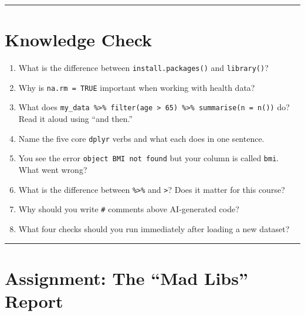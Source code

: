\documentclass[
  letterpaper,
  DIV=11,
  numbers=noendperiod,
  oneside]{scrreprt}
\providecommand{\tightlist}{%
  \setlength{\itemsep}{0pt}\setlength{\parskip}{0pt}}
\begin{document}
\begin{center}\rule{0.5\linewidth}{0.5pt}\end{center}

\section*{\texorpdfstring{Knowledge Check
}{Knowledge Check }}\label{knowledge-check}


\begin{enumerate}
\def\labelenumi{\arabic{enumi}.}
\tightlist
\item
  What is the difference between \texttt{install.packages()} and
  \texttt{library()}?
\item
  Why is \texttt{na.rm\ =\ TRUE} important when working with health
  data?
\item
  What does
  \texttt{my\_data\ \%\textgreater{}\%\ filter(age\ \textgreater{}\ 65)\ \%\textgreater{}\%\ summarise(n\ =\ n())}
  do? Read it aloud using ``and then.''
\item
  Name the five core \texttt{dplyr} verbs and what each does in one
  sentence.
\item
  You see the error
  \texttt{object\ \textquotesingle{}BMI\textquotesingle{}\ not\ found}
  but your column is called \texttt{bmi}. What went wrong?
\item
  What is the difference between \texttt{\%\textgreater{}\%} and
  \texttt{\textbar{}\textgreater{}}? Does it matter for this course?
\item
  Why should you write \texttt{\#} comments above AI-generated code?
\item
  What four checks should you run immediately after loading a new
  dataset?
\end{enumerate}

\begin{center}\rule{0.5\linewidth}{0.5pt}\end{center}

\section*{Assignment: The ``Mad Libs''
Report}\label{assignment-the-mad-libs-report}

\end{document}
